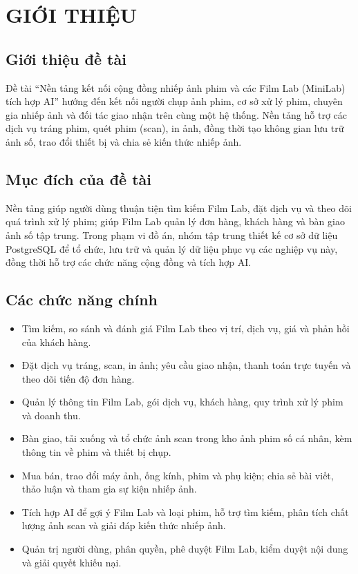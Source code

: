 \chapter{GIỚI THIỆU}

\section{Giới thiệu đề tài}

Đề tài ``Nền tảng kết nối cộng đồng nhiếp ảnh phim và các Film Lab (MiniLab) tích hợp AI'' hướng đến kết nối người chụp ảnh phim, cơ sở xử lý phim, chuyên gia nhiếp ảnh và đối tác giao nhận trên cùng một hệ thống. Nền tảng hỗ trợ các dịch vụ tráng phim, quét phim (scan), in ảnh, đồng thời tạo không gian lưu trữ ảnh số, trao đổi thiết bị và chia sẻ kiến thức nhiếp ảnh.

\section{Mục đích của đề tài}

Nền tảng giúp người dùng thuận tiện tìm kiếm Film Lab, đặt dịch vụ và theo dõi quá trình xử lý phim; giúp Film Lab quản lý đơn hàng, khách hàng và bàn giao ảnh số tập trung. Trong phạm vi đồ án, nhóm tập trung thiết kế cơ sở dữ liệu PostgreSQL để tổ chức, lưu trữ và quản lý dữ liệu phục vụ các nghiệp vụ này, đồng thời hỗ trợ các chức năng cộng đồng và tích hợp AI.

\section{Các chức năng chính}

\begin{itemize}
    \item Tìm kiếm, so sánh và đánh giá Film Lab theo vị trí, dịch vụ, giá và phản hồi của khách hàng.
    \item Đặt dịch vụ tráng, scan, in ảnh; yêu cầu giao nhận, thanh toán trực tuyến và theo dõi tiến độ đơn hàng.
    \item Quản lý thông tin Film Lab, gói dịch vụ, khách hàng, quy trình xử lý phim và doanh thu.
    \item Bàn giao, tải xuống và tổ chức ảnh scan trong kho ảnh phim số cá nhân, kèm thông tin về phim và thiết bị chụp.
    \item Mua bán, trao đổi máy ảnh, ống kính, phim và phụ kiện; chia sẻ bài viết, thảo luận và tham gia sự kiện nhiếp ảnh.
    \item Tích hợp AI để gợi ý Film Lab và loại phim, hỗ trợ tìm kiếm, phân tích chất lượng ảnh scan và giải đáp kiến thức nhiếp ảnh.
    \item Quản trị người dùng, phân quyền, phê duyệt Film Lab, kiểm duyệt nội dung và giải quyết khiếu nại.
\end{itemize}
